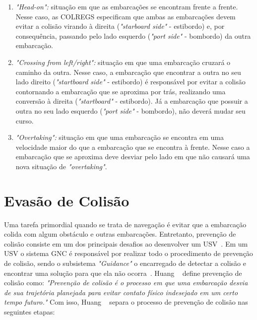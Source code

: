         \begin{enumerate}[label=\alph*]
            \item \textit{"Head-on":} situação em que as embarcações se encontram frente a frente. Nesse caso, as COLREGS especificam que ambas as embarcações devem evitar a colisão virando à direita  (\textit{"starboard side"} - estibordo) e, por consequência, passando pelo lado esquerdo (\textit{"port side"} - bombordo) da outra embarcação.
            
            \item \textit{"Crossing from left/right":} situação em que uma embarcação cruzará o caminho da outra. Nesse caso, a embarcação que encontrar a outra no seu lado direito (\textit{"startboard side"} - estibordo) é responsável por evitar a colisão contornando a embarcação que se aproxima por trás, realizando uma conversão à direita (\textit{"startboard"} - estibordo). Já a embarcação que possuir a outra no seu lado esquerdo (\textit{"port side"} - bombordo), não deverá mudar seu curso.
            
            \item \textit{"Overtaking":} situação em que uma embarcação se encontra em uma velocidade maior do que a embarcação que se encontra à frente. Nesse caso a embarcação que se aproxima deve desviar pelo lado em que não causará uma nova situação de \textit{"overtaking"}.
        \end{enumerate}
    
    \section{Evasão de Colisão}\label{subchap2:prev_col}
        Uma tarefa primordial quando se trata de navegação é evitar que a embarcação colida com algum obstáculo e outras embarcações. Entretanto, prevenção de colisão consiste em um dos principais desafios ao desenvolver um USV~\cite{Jurak2020COLREGS}. Em um USV o sistema GNC é responsável por realizar todo o procedimento de prevenção de colisão, sendo o subsistema \textit{"Guidance"} o encarregado de detectar a colisão e encontrar uma solução para que ela não ocorra~\cite{Huang2020Ship}.
        Huang \etal~\cite[p.451]{Huang2020Ship} define prevenção de colisão como: \textit{"Prevenção de colisão é o processo em que uma embarcação desvia de sua trajetória planejada para evitar contato físico indesejado em um certo tempo futuro."} Com isso, Huang \etal~\cite{Huang2020Ship} separa o processo de prevenção de colisão nas seguintes etapas: 
        
